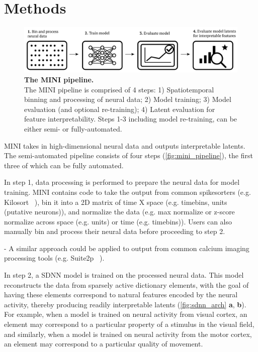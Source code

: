 \section{Methods}

\begin{figure}[h]
    \centering
    \includegraphics[width=\linewidth]{figures/mini_pipeline.pdf}
    \caption{
        \textbf{The MINI pipeline.} \\
        \small The MINI pipeline is comprised of 4 steps: 1) Spatiotemporal binning and processing of neural data; 2) Model training; 3) Model evaluation (and optional re-training); 4) Latent evaluation for feature interpretability. Steps 1-3 including model re-training, can be either semi- or fully-automated.
    }
    \label{fig:mini_pipeline}
\end{figure}

MINI takes in high-dimensional neural data and outputs interpretable latents. The semi-automated pipeline consists of four steps (\autoref{fig:mini_pipeline}), the first three of which can be fully automated.

In step 1, data processing is performed to prepare the neural data for model training. MINI contains code to take the output from common spikesorters (e.g. Kilosort ~\cite{pachitariu_2016_kilosort}), bin it into a 2D matrix of time X space (e.g. timebins, units (putative neurons)), and normalize the data (e.g. max normalize or z-score normalize across space (e.g. units) or time (e.g. timebins)). Users can also manually bin and process their neural data before proceeding to step 2.

- A similar approach could be applied to output from common calcium imaging processing tools (e.g. Suite2p ~\cite{pachitariu_2017_suite2p}).

In step 2, a SDNN model is trained on the processed neural data. This model reconstructs the data from sparsely active dictionary elements, with the goal of having these elements correspond to natural features encoded by the neural activity, thereby producing readily interpretable latents (\autoref{fig:sdnn_arch} \textbf{a}, \textbf{b}). For example, when a model is trained on neural activity from visual cortex, an element may correspond to a particular property of a stimulus in the visual field, and similarly, when a model is trained on neural activity from the motor cortex, an element may correspond to a particular quality of movement. 

